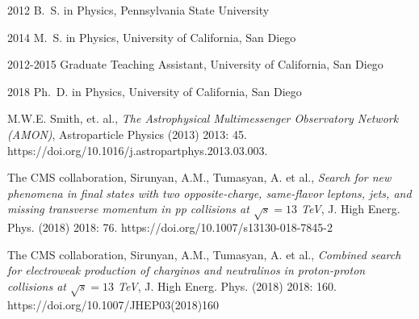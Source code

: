 \begin{frontmatter}
%
%
\begin{vitapage}
\begin{vita}
  \item[2012] B.~S. in Physics, Pennsylvania State University
  \item[2014] M.~S. in Physics, University of California, San Diego
  \item[2012-2015] Graduate Teaching Assistant, University of California, San Diego
  \item[2018] Ph.~D. in Physics, University of California, San Diego
\end{vita}
\begin{publications}
  \item M.W.E. Smith, et. al., \emph{The Astrophysical Multimessenger Observatory Network (AMON)}, Astroparticle Physics (2013) 2013: 45. https://doi.org/10.1016/j.astropartphys.2013.03.003.
  \item The CMS collaboration, Sirunyan, A.M., Tumasyan, A. et al., \emph{Search for new phenomena in final states with two opposite-charge, same-flavor leptons, jets, and missing transverse momentum in pp collisions at $\sqrt{s}=13$ TeV},  J. High Energ. Phys. (2018) 2018: 76. https://doi.org/10.1007/s13130-018-7845-2
  \item The CMS collaboration, Sirunyan, A.M., Tumasyan, A. et al., \emph{Combined search for electroweak production of charginos and neutralinos in proton-proton collisions at  $\sqrt{s}=13$ TeV}, J. High Energ. Phys. (2018) 2018: 160. https://doi.org/10.1007/JHEP03(2018)160
\end{publications}
\end{vitapage}



\end{frontmatter}
